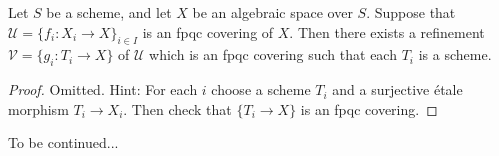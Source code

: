 \begin{lemma}
\label{lemma-refine-fpqc-schemes}
Let $S$ be a scheme, and let $X$ be an algebraic space over $S$.
Suppose that $\mathcal{U} = \{f_i : X_i \to X\}_{i \in I}$ is an
fpqc covering of $X$. Then there exists a refinement
$\mathcal{V} = \{g_i : T_i \to X\}$ of $\mathcal{U}$ which is an
fpqc covering such that each $T_i$ is a scheme.
\end{lemma}

\begin{proof}
Omitted. Hint: For each $i$ choose a scheme $T_i$ and a surjective \'etale
morphism $T_i \to X_i$. Then check that $\{T_i \to X\}$ is an fpqc covering.
\end{proof}

\noindent
To be continued...












